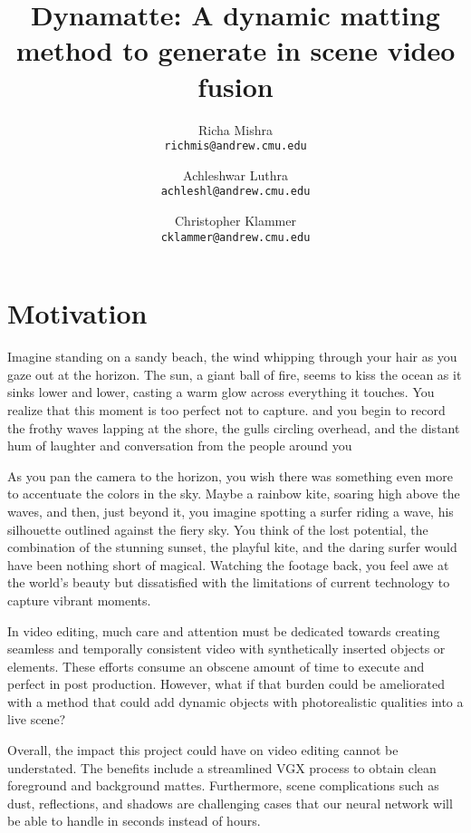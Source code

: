 \documentclass{article}
\title{Dynamatte: A dynamic matting method to generate in scene video fusion}
\author{Richa Mishra \\
\small\texttt{richmis@andrew.cmu.edu}
\and
Achleshwar Luthra \\
\small\texttt{achleshl@andrew.cmu.edu}
\and
Christopher Klammer \\
\small\texttt{cklammer@andrew.cmu.edu}}
\begin{document}
\maketitle

\section{Motivation}

Imagine standing on a sandy beach, the wind whipping through your hair as you gaze out at the horizon. The sun, a giant ball of fire, seems to kiss the ocean as it sinks lower and lower, casting a warm glow across everything it touches. You realize that this moment is too perfect not to capture. and you begin to record the frothy waves lapping at the shore, the gulls circling overhead, and the distant hum of laughter and conversation from the people around you

As you pan the camera to the horizon, you wish there was something even more to accentuate the colors in the sky. Maybe a rainbow kite, soaring high above the waves, and then, just beyond it, you imagine spotting a surfer riding a wave, his silhouette outlined against the fiery sky. You think of the lost potential, the combination of the stunning sunset, the playful kite, and the daring surfer would have been nothing short of magical. Watching the footage back, you feel awe at the world's beauty but dissatisfied with the limitations of current technology to capture vibrant moments.

In video editing, much care and attention must be dedicated towards creating seamless and temporally consistent video with synthetically inserted objects or elements. These efforts consume an obscene amount of time to execute and perfect in post production. However, what if that burden could be ameliorated with a method that could add dynamic objects with photorealistic qualities into a live scene? 

Overall, the impact this project could have on video editing cannot be understated. The benefits include a streamlined VGX process to obtain clean foreground and background mattes. Furthermore, scene complications such as dust, reflections, and shadows are challenging cases that our neural network will be able to handle in seconds instead of hours.

\end{document}
